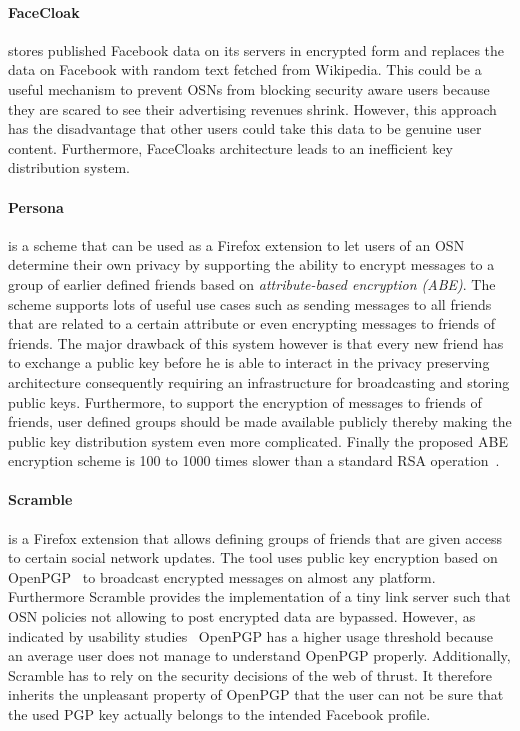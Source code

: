 \paragraph{FaceCloak~\cite{art:LuoXH09}} stores published Facebook data on its servers in encrypted form and replaces the data on Facebook with random text fetched from Wikipedia. This could be a useful mechanism to prevent OSNs from blocking security aware users because they are scared to see their advertising revenues shrink. However, this approach has the disadvantage that other users could take this data to be genuine user content. Furthermore, FaceCloaks architecture leads to an inefficient key distribution system.

\paragraph{Persona~\cite{art:BadenBSBS09}} is a scheme that can be used as a Firefox extension to let users of an OSN determine their own privacy by supporting the ability to encrypt messages to a group of earlier defined friends based on \textit{attribute-based encryption (ABE)}\cite{art:SahaiW04}. The scheme supports lots of useful use cases such as sending messages to all friends that are related to a certain attribute or even encrypting messages to friends of friends. The major drawback of this system however is that every new friend has to exchange a public key before he is able to interact in the privacy preserving architecture consequently requiring an infrastructure for broadcasting and storing public keys. Furthermore, to support the encryption of messages to friends of friends, user defined groups should be made available publicly thereby making the public key distribution system even more complicated. Finally the proposed ABE encryption scheme is 100 to 1000 times slower than a standard RSA operation~\cite{art:BadenBSBS09}.

\paragraph{Scramble~\cite{art:BeatoKW11}} is a Firefox extension that allows defining groups of friends that are given access to certain social network updates. The tool uses public key encryption based on OpenPGP~\cite{rfc4880} to broadcast encrypted messages on almost any platform. Furthermore Scramble provides the implementation of a tiny link server such that OSN policies not allowing to post encrypted data are bypassed. However, as indicated by usability studies~\cite{art:WhittenT99} OpenPGP has a higher usage threshold because an average user does not manage to understand OpenPGP properly. Additionally, Scramble has to rely on the security decisions of the web of thrust. It therefore inherits the unpleasant property of OpenPGP that the user can not be sure that the used PGP key actually belongs to the intended Facebook profile.

